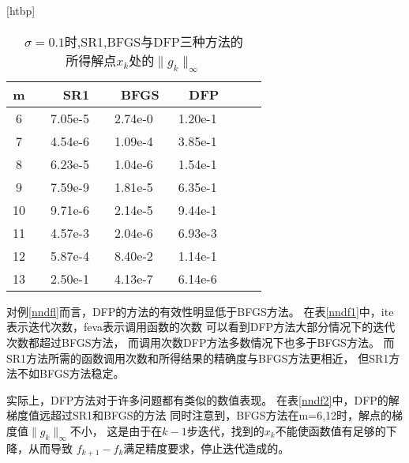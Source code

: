 \begin{example}
                \begin{table}\label{nndf2}[htbp]\center
                    \caption{$\sigma = 0.1$时,SR1,BFGS与DFP三种方法的
                            \\所得解点$x_k$处的$\|g_k\|_\infty$}
                    \begin{tabular}{ccccccccccc}
                    \toprule %
                        \multicolumn{2}{c}{m}&& 
                        \multicolumn{2}{c}{SR1}&                   \multicolumn{2}{c}{BFGS}&                  \multicolumn{2}{c}{DFP}&\\
                    \hline %
                        \multicolumn{2}{c}{6} & &7.05e-5& &2.74e-0& &1.20e-1& \\
                        \multicolumn{2}{c}{7} & &4.54e-6& &1.09e-4& &3.85e-1& \\
                        \multicolumn{2}{c}{8} & &6.23e-5& &1.04e-6& &1.54e-1& \\
                        \multicolumn{2}{c}{9} & &7.59e-9& &1.81e-5& &6.35e-1& \\
                        \multicolumn{2}{c}{10}& &9.71e-6& &2.14e-5& &9.44e-1& \\
                        \multicolumn{2}{c}{11}& &4.57e-3& &2.04e-6& &6.93e-3& \\
                        \multicolumn{2}{c}{12}& &5.87e-4& &8.40e-2& &1.14e-1& \\
                        \multicolumn{2}{c}{13}& &2.50e-1& &4.13e-7& &6.14e-6& \\
                    \bottomrule %
                    \end{tabular}
                    \label{tableExample2}
                \end{table}
            \end{example}
            
            对例\ref{nndfl}而言，DFP的方法的有效性明显低于BFGS方法。
            在表\ref{nndf1}中，ite表示迭代次数，feva表示调用函数的次数
            可以看到DFP方法大部分情况下的迭代次数都超过BFGS方法，
            而调用次数DFP方法多数情况下也多于BFGS方法。
            而SR1方法所需的函数调用次数和所得结果的精确度与BFGS方法更相近，
            但SR1方法不如BFGS方法稳定。
            
            实际上，DFP方法对于许多问题都有类似的数值表现。
            在表\ref{nndf2}中，DFP的解梯度值远超过SR1和BFGS的方法
            同时注意到，BFGS方法在m=6,12时，解点的梯度值$\|g_k\|_\infty$不小，
            这是由于在$k-1$步迭代，找到的$x_k$不能使函数值有足够的下降，从而导致
            $f_{k+1}-f_{k}$满足精度要求，停止迭代造成的。

